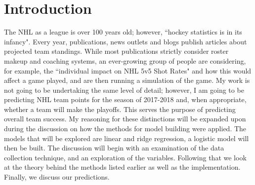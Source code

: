 \chapter{Introduction}
The NHL as a league is over 100 years old\cite{NHL}; however, ``hockey statistics is in its infancy".\cite{Weissbock} Every year, publications, news outlets and blogs\cite{blogs} publish articles about projected team standings. While most publications strictly consider roster makeup and coaching systems,\cite{Publications} an ever-growing group of people are considering, for example, the ``individual impact on NHL 5v5 Shot Rates"\cite{shot rates} and how this would affect a game played, and are then running a simulation of the game.\cite{Magnus} My work is not going to be undertaking the same level of detail; however, I am going to be predicting NHL team points for the season of 2017-2018 and, when appropriate, whether a team will make the playoffs. This serves the purpose of predicting overall team success. My reasoning for these distinctions will be expanded upon during the discussion on how the methods for model building were applied. The models that will be explored are linear and ridge regression, a logistic model will then be built. The discussion will begin with an examination of the data collection technique, and an exploration of the variables. Following that we  look at the theory behind the methods listed earlier as well as the implementation. Finally, we discuss our predictions.     












